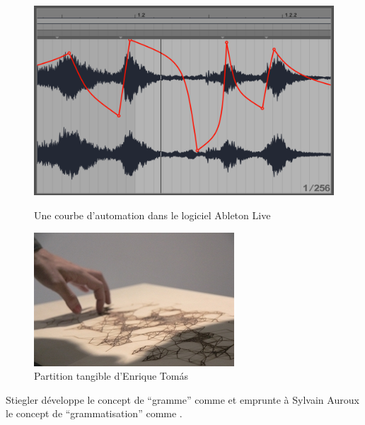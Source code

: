 \begin{figure}[!htbp]
	\captionsetup{format=plain}%
	\centering
	\begin{minipage}[t]{0.48\textwidth}
		\includegraphics[width=\linewidth]{gfx/03_gesture/AbletonLiveAutomation_72dpi.png}
		\caption{Une courbe d'automation dans le logiciel Ableton Live}
		\label{fig:gesture:automation}
	\end{minipage}
	\hspace{.02\linewidth}
	\begin{minipage}[t]{0.48\textwidth}
	    \includegraphics[width=\linewidth]{gfx/03_gesture/EnriqueThomas-TangibleScore_72dpi.jpg}
		\caption{Partition tangible d'Enrique Tomás}
		\label{fig:gesture:tangible_score}
	\end{minipage}
\end{figure}

Stiegler développe le concept de ``gramme'' comme  et emprunte à Sylvain Auroux \cite{auroux_revolution_1994} le concept de ``grammatisation'' comme .

